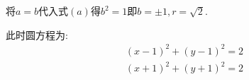 \documentclass[answers]{exam}
\begin{document}
\begin{questions}
\begin{solution}
\begin{enumerate}[label=(\arabic*)]
			      将$a=b$代入式$(a)$得$b^2 = 1$即$b=\pm1, r=\sqrt{2}$.

			      此时圆方程为:
			      \begin{align*}
				      (x-1)^2 + (y-1)^2 = 2 \\
				      (x+1)^2 + (y+1)^2 = 2
			      \end{align*}
		\end{enumerate}
	\end{solution}

\end{questions}
\end{document}
